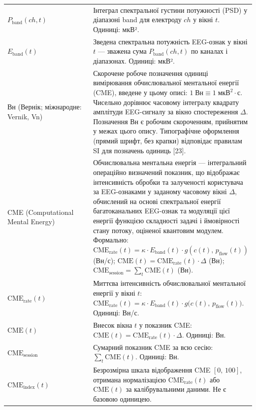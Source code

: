 \documentclass[12pt,a4paper]{article}
\begin{document}
{\begin{longtable}[]{@{}

  >{\raggedright\arraybackslash}p{0.4211\linewidth}

  >{\raggedright\arraybackslash}p{0.5789\linewidth}@{}}
\(P_{\text{band}}(ch, t)\) & Інтеграл спектральної густини потужності (PSD) у діапазоні band для електроду \(ch\) у вікні \(t\). Одиниці: мкВ². \\

\(E_{\text{band}}(t)\) & Зведена спектральна потужність EEG-ознак у вікні \(t\) --- зважена сума \(P_{\text{band}}(ch, t)\) по каналах і діапазонах. Одиниці: мкВ². \\

Вн (Вернік; міжнародне: Vernik, Vn) & Скорочене робоче позначення одиниці вимірювання обчислювальної ментальної енергії (CME), введене у цьому описі: \(1\;\text{Вн} \equiv 1\;\text{мкВ}^2 \cdot \text{с}\). Чисельно дорівнює часовому інтегралу квадрату амплітуди EEG-сигналу за вікно спостереження \(\Delta\). Позначення Вн є робочим скороченням, прийнятим у межах цього опису. Типографічне оформлення (прямий шрифт, без крапки) відповідає правилам SI для позначень одиниць {[}23{]}. \\

CME (Computational Mental Energy) & Обчислювальна ментальна енергія --- інтегральний операційно визначений показник, що відображає інтенсивність обробки та залученості користувача за EEG-ознаками у заданому часовому вікні \(\Delta\), обчислений на основі спектральної енергії багатоканальних EEG-ознак та модуляції цієї енергії функцією складності задачі і ймовірності стану потоку, оціненої квантовим модулем. Формально: \(\text{CME}_{\text{rate}}(t) = \kappa \cdot E_{\text{band}}(t) \cdot g(c(t),\,p_{\text{flow}}(t))\) (Вн/с); \(\text{CME}(t) = \text{CME}_{\text{rate}}(t) \cdot \Delta\) (Вн); \(\text{CME}_{\text{session}} = \sum_t \text{CME}(t)\) (Вн). \\

\(\text{CME}_{\text{rate}}(t)\) & Миттєва інтенсивність обчислювальної ментальної енергії у вікні \(t\): \(\text{CME}_{\text{rate}}(t) = \kappa \cdot E_{\text{band}}(t) \cdot g\bigl(c(t),\,p_{\text{flow}}(t)\bigr)\). Одиниці: Вн/с. \\

\(\text{CME}(t)\) & Внесок вікна \(t\) у показник CME: \(\text{CME}(t) = \text{CME}_{\text{rate}}(t) \cdot \Delta\). Одиниці: Вн. \\

\(\text{CME}_{\text{session}}\) & Сумарний показник CME за всю сесію: \(\sum_t \text{CME}(t)\). Одиниці: Вн. \\

\(\text{CME}_{\text{index}}(t)\) & Безрозмірна шкала відображення CME \([0,\,100]\), отримана нормалізацією \(\text{CME}_{\text{rate}}(t)\) або \(\text{CME}(t)\) за калібрувальними даними. Не є базовою одиницею. \\


\end{longtable}}
\end{document}
